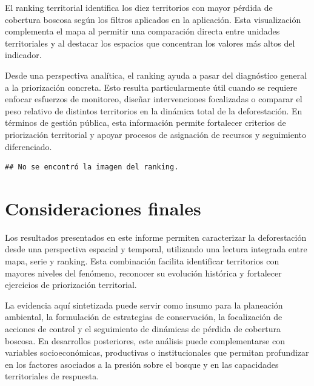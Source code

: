 \documentclass[
]{article}
\begin{document}
El ranking territorial identifica los diez territorios con mayor pérdida
de cobertura boscosa según los filtros aplicados en la aplicación. Esta
visualización complementa el mapa al permitir una comparación directa
entre unidades territoriales y al destacar los espacios que concentran
los valores más altos del indicador.

Desde una perspectiva analítica, el ranking ayuda a pasar del
diagnóstico general a la priorización concreta. Esto resulta
particularmente útil cuando se requiere enfocar esfuerzos de monitoreo,
diseñar intervenciones focalizadas o comparar el peso relativo de
distintos territorios en la dinámica total de la deforestación. En
términos de gestión pública, esta información permite fortalecer
criterios de priorización territorial y apoyar procesos de asignación de
recursos y seguimiento diferenciado.

\begin{verbatim}
## No se encontró la imagen del ranking.
\end{verbatim}

\section{Consideraciones finales}\label{consideraciones-finales}

Los resultados presentados en este informe permiten caracterizar la
deforestación desde una perspectiva espacial y temporal, utilizando una
lectura integrada entre mapa, serie y ranking. Esta combinación facilita
identificar territorios con mayores niveles del fenómeno, reconocer su
evolución histórica y fortalecer ejercicios de priorización territorial.

La evidencia aquí sintetizada puede servir como insumo para la
planeación ambiental, la formulación de estrategias de conservación, la
focalización de acciones de control y el seguimiento de dinámicas de
pérdida de cobertura boscosa. En desarrollos posteriores, este análisis
puede complementarse con variables socioeconómicas, productivas o
institucionales que permitan profundizar en los factores asociados a la
presión sobre el bosque y en las capacidades territoriales de respuesta.
\end{document}
